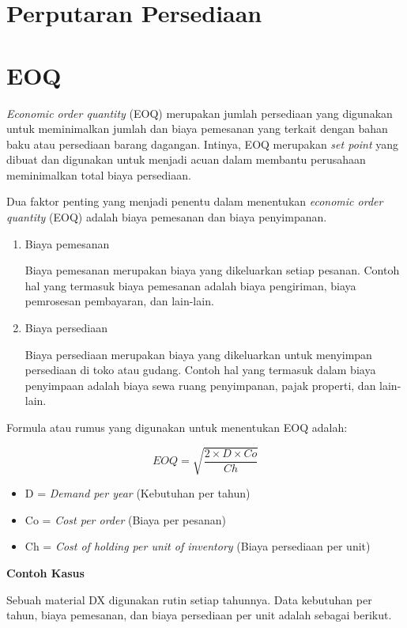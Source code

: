 \section{Perputaran Persediaan}
\section{EOQ}

\textit{Economic order quantity} (EOQ) merupakan jumlah persediaan yang digunakan untuk meminimalkan jumlah dan biaya pemesanan yang terkait dengan bahan baku atau persediaan barang dagangan. Intinya, EOQ merupakan \textit{set point} yang dibuat dan digunakan untuk menjadi acuan dalam membantu perusahaan meminimalkan total biaya persediaan.

Dua faktor penting yang menjadi penentu dalam menentukan \textit{economic order quantity} (EOQ) adalah biaya pemesanan dan biaya penyimpanan.

\begin{enumerate}
	\item Biaya pemesanan
	
	Biaya pemesanan merupakan biaya yang dikeluarkan setiap pesanan. Contoh hal yang termasuk biaya pemesanan adalah biaya pengiriman, biaya pemrosesan pembayaran, dan lain-lain.

	\item Biaya persediaan
	
	Biaya persediaan merupakan biaya yang dikeluarkan untuk menyimpan persediaan di toko atau gudang. Contoh hal yang termasuk dalam biaya penyimpaan adalah biaya sewa ruang penyimpanan, pajak properti, dan lain-lain.
\end{enumerate}

Formula atau rumus yang digunakan untuk menentukan EOQ adalah:

\[EOQ=\sqrt{\frac{2 \times D \times Co}{Ch}}\]

\begin{itemize}
	\item D = \textit{Demand per year} (Kebutuhan per tahun)
	\item Co = \textit{Cost per order} (Biaya per pesanan)
	\item Ch = \textit{Cost of holding per unit of inventory} (Biaya persediaan per unit)
\end{itemize}

\textbf{Contoh Kasus}

Sebuah material DX digunakan rutin setiap tahunnya. Data kebutuhan per tahun, biaya pemesanan, dan biaya persediaan per unit adalah sebagai berikut.

